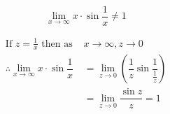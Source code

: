 \documentclass[14pt,fleqn]{extarticle}
\begin{document}
 

\begin{snippet}
    \incorrect

\[ \lim_{x\to\infty} x\cdot\sin\dfrac{1}{x} \neq1 \]    
    \reason

\begin{align}
\text{If } z = \frac{1}{x}\text{ then as }&x\to\infty, z\to 0 \\
\therefore \lim_{x\to\infty} x\cdot\sin\dfrac{1}{x} &= 
\lim_{z\to 0}\left( \dfrac{1}{z}\sin\dfrac{1}{\frac{1}{z}}\right) \\
&=\lim_{z\to 0}\dfrac{\sin z}{z} = 1
\end{align}

    
\end{snippet} 
\end{document}
